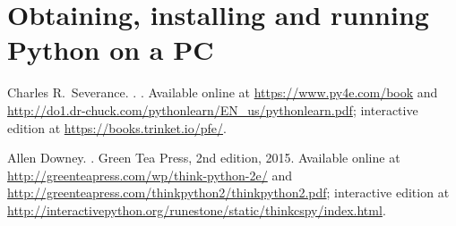 \documentclass[11pt,a4paper]{article}
\begin{document}
\section{Obtaining, installing and running Python on a PC}
\label{sec:obta-inst-runn}




\begin{thebibliography}{1}

Charles R.\ Severance.
.
.
\newblock Available online at \url{https://www.py4e.com/book} and
 \url{http://do1.dr-chuck.com/pythonlearn/EN_us/pythonlearn.pdf}; interactive edition at
 \url{https://books.trinket.io/pfe/}.

Allen Downey.
.
\newblock Green Tea Press, 2nd edition, 2015.
\newblock Available online at \url{http://greenteapress.com/wp/think-python-2e/} and
 \url{http://greenteapress.com/thinkpython2/thinkpython2.pdf}; interactive edition at
 \url{http://interactivepython.org/runestone/static/thinkcspy/index.html}.

\end{thebibliography}
\end{document}
